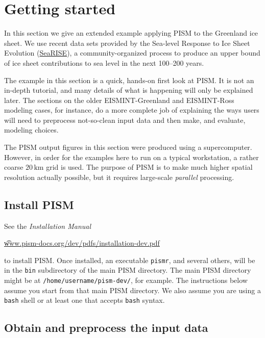 
\section{Getting started}\label{sect:start}

In this section we give an extended example applying PISM to the Greenland ice sheet.  We use recent data sets provided by the Sea-level Response to Ice Sheet Evolution (\href{http://websrv.cs.umt.edu/isis/index.php/SeaRISE_Assessment}{SeaRISE}), a community-organized process to produce an upper bound of ice sheet contributions to sea level in the next 100--200 years.

The example in this section is a quick, hands-on first look at PISM.  It is not an in-depth tutorial, and many details of what is happening will only be explained later.  The sections on the older EISMINT-Greenland and EISMINT-Ross modeling cases, for instance, do a more complete job of explaining the ways users will need to preprocess not-so-clean input data and then make, and evaluate, modeling choices.

The PISM output figures in this section were produced using a supercomputer.  However, in order for the examples here to run on a typical workstation, a rather coarse $20\,\textrm{km}$ grid is used.  The purpose of PISM is to make much higher spatial resolution actually possible, but it requires large-scale \emph{parallel} processing.


\subsection{Install PISM}

See the \emph{Installation Manual}
   \begin{center}
     \href{http://www.pism-docs.org/dev/pdfs/installation-dev.pdf}{\t{www.pism-docs.org/dev/pdfs/installation-dev.pdf}}
   \end{center}
to install PISM.  Once installed, an executable \verb|pismr|, and several others, will be in the \verb|bin| subdirectory of the main PISM directory.  The main PISM directory might be at \verb|/home/username/pism-dev/|, for example.  The instructions below assume you start from that main PISM directory.  We also assume you are using a \verb|bash| shell or at least one that accepts \verb|bash| syntax.


\subsection{Obtain and preprocess the input data}

